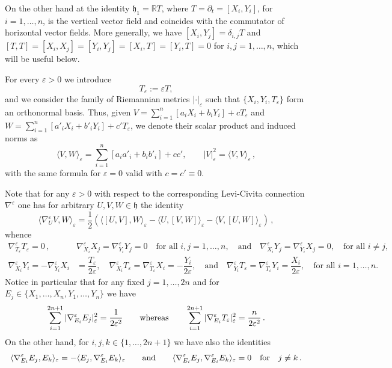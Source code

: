\documentclass[10pt]{amsart}
\numberwithin{equation}{section}
\theoremstyle{definition}
\newcommand{\eps}{\varepsilon}
\newcommand{\scal}[2]{\langle {#1},{#2}\rangle}
\newcommand{\eT}{T_{\eps}}
\begin{document}
On the other hand at the identity $\mathfrak{h}_1=\mathbb{R} T$, where $T=\partial_t=[X_i,Y_i]$, for $i=1, \ldots, n$, is the vertical vector field and coincides with the commutator of horizontal vector fields. More generally, we have $[X_i,Y_j]=\delta_{i,j} T$ and $[T,T]=[X_i,X_j]=[Y_i,Y_j]=[X_i,T]=[Y_i,T]=0$ for $i,j=1, \ldots, n$, which will be useful below.
 
 
For every $\eps >0$ we introduce 
$$\eT := \eps T,$$
\noindent and we consider the family of Riemannian metrics $|\cdot|_\varepsilon$
such that $\{X_i,Y_i,\eT\}$ form an orthonormal basis. Thus, given $V = \sum_{i=1}^{n} \left[a_i X_i + b_i Y_i \right]+ c \eT$ and $W = \sum_{i=1}^{n} \left[a'_i X_i + b'_i Y_i\right] + c' \eT$,
we denote their scalar product and induced norms as
$$\scal{V}{W}_{\eps} = \sum_{i=1}^{n} \left[ a_i a'_i + b_i b'_i \right] + c c', \qquad |V|_\varepsilon^2=\scal{V}{V}_\varepsilon \, ,$$
with the same formula for $\varepsilon=0$ valid with $c=c'\equiv0$. 

Note that for any $\varepsilon>0$ with respect to the corresponding Levi-Civita connection $\nabla^\varepsilon$ one has for arbitrary $U,V,W \in \mathfrak{h}$ the identity
\[ \scal{\nabla^\varepsilon_U V}{W}_\varepsilon=\frac12 \left( \scal{[U,V]}{W}_\varepsilon -\scal{U}{[V,W]}_\varepsilon-\scal{V}{[U,W]}_\varepsilon \right) \, ,\]
whence
\begin{align*}
\nabla^\varepsilon_{T_\varepsilon}T_\varepsilon=0 \, ,  \quad &\nabla^\varepsilon_{X_i}X_j = \nabla^{\varepsilon}_{Y_i}Y_j = 0 \quad \textrm{for all } i,j=1,\ldots,n, \quad \textrm{and} \quad
\nabla^{\varepsilon}_{X_i}Y_j = \nabla^{\varepsilon}_{Y_i}X_j = 0, \quad \textrm{for all } i\neq j,\\
\nabla^{\varepsilon}_{X_i}Y_i = - \nabla^{\varepsilon}_{Y_i}X_i &= \dfrac{T_{\varepsilon}}{2\varepsilon}, \quad \nabla^{\varepsilon}_{X_i}T_{\varepsilon} = \nabla^{\varepsilon}_{T_{\varepsilon}}X_i = -\dfrac{Y_i}{2\varepsilon}, \quad \textrm{and} \quad 
\nabla^{\varepsilon}_{Y_i}T_{\varepsilon} = \nabla^{\varepsilon}_{T_{\varepsilon}}Y_i = \dfrac{X_i}{2\varepsilon}, \quad \textrm{for all } i=1,\ldots,n.
\end{align*}
Notice in particular that for any fixed $j =1, \ldots, 2n$ and for $E_j \in \{X_1,\ldots, X_n, Y_1, \ldots, Y_n\} $ we have
\begin{equation}
\label{constant-square}
 \sum_{i=1}^{2n+1}| \nabla^\varepsilon_{E_i} E_j|_\varepsilon^2=\frac{1}{2 \varepsilon^2}  \qquad \hbox{whereas} \qquad \sum_{i=1}^{2n+1}| \nabla^\varepsilon_{E_i}T_\varepsilon|_\varepsilon^2=\frac{n}{2\varepsilon^2} \, .	
\end{equation}
On the other hand, for $i, j , k \in \{1, \ldots , 2n+1\}$ we have also the identities
\begin{equation}
\label{orthogonal-derivatives}
\langle   \nabla^\varepsilon_{E_i} E_j,  E_k\rangle_\varepsilon=-\langle   E_j,  \nabla^\varepsilon_{E_i} E_k\rangle_\varepsilon \qquad \hbox{and} \qquad \langle   \nabla^\varepsilon_{E_i} E_j,  \nabla^\varepsilon_{E_i} E_k\rangle_\varepsilon=0  \quad \hbox{for} \quad j\neq k \, .	
\end{equation}
\end{document}
